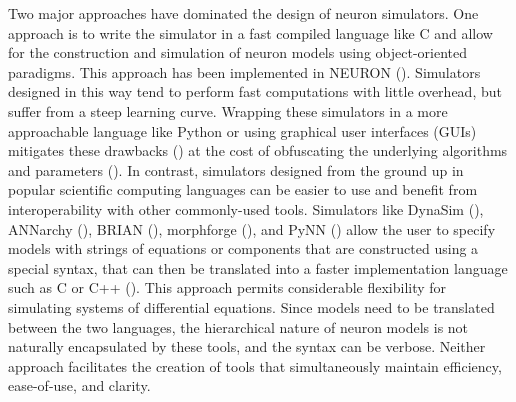 \documentclass{frontiersSCNS} %
\begin{document}
Two major approaches have dominated the design of neuron simulators. One approach is to write the simulator in a fast compiled language like C and allow for the construction and simulation of neuron models using object-oriented paradigms. This approach has been implemented in NEURON (\cite{hinesNEURONSimulationEnvironment1997}). Simulators designed in this way tend to perform fast computations with little overhead, but suffer from a steep learning curve. Wrapping these simulators in a more approachable language like Python or using graphical user interfaces (GUIs) mitigates these drawbacks (\cite{hinesNEURONPython2009, gratiy2018bionet}) at the cost of obfuscating the underlying algorithms and parameters (\cite{bretteSimulationNetworksSpiking2007, hinesNEURONPython2009}). In contrast, simulators designed from the ground up in popular scientific computing languages can be easier to use and benefit from interoperability with other commonly-used tools. Simulators like DynaSim (\cite{sherfeyDynaSimMATLABToolbox2018}), ANNarchy (\cite{vitayANNarchyCodeGeneration2015}), BRIAN (\cite{stimbergBrianSecondComing2013}), morphforge (\cite{hullMorphforgeToolboxSimulating2014}), and PyNN (\cite{davisonPyNNCommonInterface2009}) allow the user to specify models with strings of equations or components that are constructed using a special syntax, that can then be translated into a faster implementation language such as C or C++ (\cite{stimbergEquationorientedSpecificationNeural2014}). This approach permits considerable flexibility for simulating systems of differential equations. Since models need to be translated between the two languages, the hierarchical nature of neuron models is not naturally encapsulated by these tools, and the syntax can be verbose. Neither approach facilitates the creation of tools that simultaneously maintain efficiency, ease-of-use, and clarity.
\end{document}
